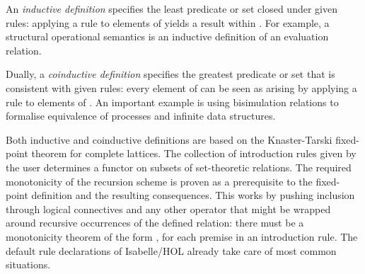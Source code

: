 \begin{isabellebody}
\begin{isamarkuptext}
  An \emph{inductive definition} specifies the least predicate or set
   closed under given rules: applying a rule to elements of
   yields a result within .  For example, a
  structural operational semantics is an inductive definition of an
  evaluation relation.

  Dually, a \emph{coinductive definition} specifies the greatest
  predicate or set  that is consistent with given rules:
  every element of  can be seen as arising by applying a rule
  to elements of .  An important example is using
  bisimulation relations to formalise equivalence of processes and
  infinite data structures.
  
  Both inductive and coinductive definitions are based on the
  Knaster-Tarski fixed-point theorem for complete lattices.  The
  collection of introduction rules given by the user determines a
  functor on subsets of set-theoretic relations.  The required
  monotonicity of the recursion scheme is proven as a prerequisite to
  the fixed-point definition and the resulting consequences.  This
  works by pushing inclusion through logical connectives and any other
  operator that might be wrapped around recursive occurrences of the
  defined relation: there must be a monotonicity theorem of the form
  , for each premise  in an
  introduction rule.  The default rule declarations of Isabelle/HOL
  already take care of most common situations.


\end{isamarkuptext}
\end{isabellebody}
